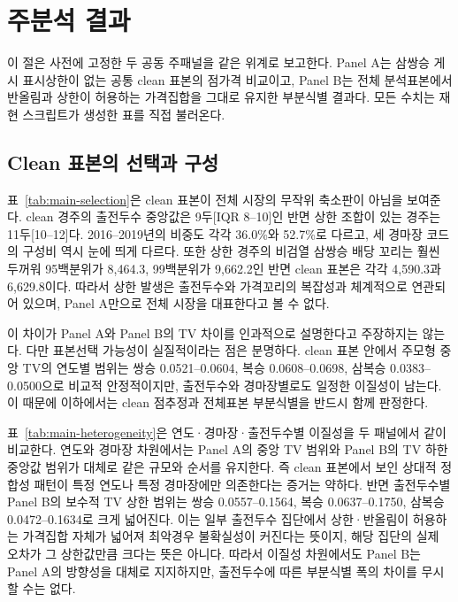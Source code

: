\section{주분석 결과}
\label{sec:main-results}

이 절은 사전에 고정한 두 공동 주패널을 같은 위계로 보고한다. Panel A는
삼쌍승 게시 표시상한이 없는 공통 clean 표본의 점가격 비교이고, Panel B는 전체
분석표본에서 반올림과 상한이 허용하는 가격집합을 그대로 유지한
부분식별 결과다. 모든 수치는 재현 스크립트가 생성한 표를 직접 불러온다.

\subsection{Clean 표본의 선택과 구성}

\begin{table}[htbp]
\centering
\caption{Clean 표본과 상한 포함 표본의 구성 비교}
\label{tab:main-selection}
\resizebox{\textwidth}{!}{}
\end{table}

표~\ref{tab:main-selection}은 clean 표본이 전체 시장의 무작위 축소판이 아님을
보여준다. clean 경주의 출전두수 중앙값은 9두[IQR 8--10]인 반면 상한 조합이
있는 경주는 11두[10--12]다. 2016--2019년의 비중도 각각 36.0\%와 52.7\%로
다르고, 세 경마장 코드의 구성비 역시 눈에 띄게 다르다. 또한 상한 경주의
비검열 삼쌍승 배당 꼬리는 훨씬 두꺼워 95백분위가 8,464.3, 99백분위가
9,662.2인 반면 clean 표본은 각각 4,590.3과 6,629.8이다. 따라서 상한 발생은
출전두수와 가격꼬리의 복잡성과 체계적으로 연관되어 있으며, Panel A만으로 전체
시장을 대표한다고 볼 수 없다.

이 차이가 Panel A와 Panel B의 TV 차이를 인과적으로 설명한다고 주장하지는
않는다. 다만 표본선택 가능성이 실질적이라는 점은 분명하다. clean 표본 안에서
주모형 중앙 TV의 연도별 범위는 쌍승 0.0521--0.0604, 복승
0.0608--0.0698, 삼복승 0.0383--0.0500으로 비교적 안정적이지만, 출전두수와
경마장별로도 일정한 이질성이 남는다. 이 때문에 이하에서는 clean 점추정과
전체표본 부분식별을 반드시 함께 판정한다.

\begin{table}[htbp]
\centering
\caption{Panel A와 Panel B의 이질성 범위 비교}
\label{tab:main-heterogeneity}
\resizebox{\textwidth}{!}{}
\end{table}

표~\ref{tab:main-heterogeneity}은 연도·경마장·출전두수별 이질성을 두 패널에서
같이 비교한다. 연도와 경마장 차원에서는 Panel A의 중앙 TV 범위와 Panel B의
TV 하한 중앙값 범위가 대체로 같은 규모와 순서를 유지한다. 즉 clean 표본에서
보인 상대적 정합성 패턴이 특정 연도나 특정 경마장에만 의존한다는 증거는 약하다.
반면 출전두수별 Panel B의 보수적 TV 상한 범위는 쌍승 0.0557--0.1564,
복승 0.0637--0.1750, 삼복승 0.0472--0.1634로 크게 넓어진다. 이는 일부
출전두수 집단에서 상한·반올림이 허용하는 가격집합 자체가 넓어져 최악경우
불확실성이 커진다는 뜻이지, 해당 집단의 실제 오차가 그 상한값만큼 크다는
뜻은 아니다. 따라서 이질성 차원에서도 Panel B는 Panel A의 방향성을 대체로
지지하지만, 출전두수에 따른 부분식별 폭의 차이를 무시할 수는 없다.

